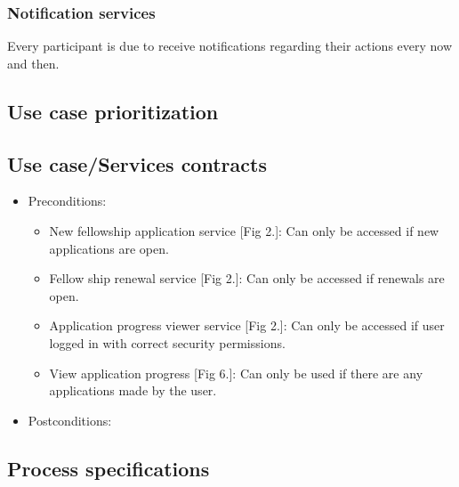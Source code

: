 \documentclass[12pt]{article}
\begin{document}
		\subsubsection{Notification services}
		Every participant is due to receive notifications regarding their actions every now and then.
		
		\vspace{0.2in}
		\subsection{Use case prioritization} %
		\vspace{0.2in}
		
		
		\vspace{0.2in}
		
		\subsection{Use case/Services contracts} %
		\vspace{0.2in}
		
		\begin{itemize}
		
		\item Preconditions:
			\begin{itemize}
				\item New fellowship application service [Fig 2.]: Can only be accessed if new applications are open. 
				\item Fellow ship renewal service [Fig 2.]: Can only be accessed if renewals are open.
				\item Application progress viewer service [Fig 2.]: Can only be accessed if user logged in with correct security permissions.
				\item View application progress [Fig 6.]: Can only be used if there are any applications made by the user.
			\end{itemize}
		\item Postconditions:
		\end{itemize}
		
		\vspace{0.2in}
		
		\subsection{Process specifications} %
		\vspace{0.2in}
		
\end{document}
